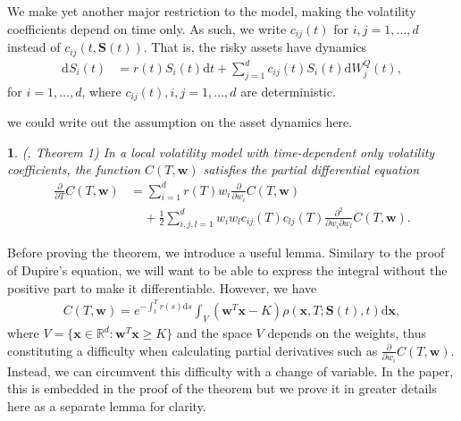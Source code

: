 \documentclass[english]{article}
\newcommand{\comment}[1]{\color{blue}#1\color{black}}
\numberwithin{equation}{section}
\numberwithin{figure}{section}
\theoremstyle{bolddescit}
\newtheorem{theorem}{\protect\theoremname}[section]
\theoremstyle{definition}
\theoremstyle{definition}
\theoremstyle{plain}
\theoremstyle{plain}
\theoremstyle{bolddesc}
\theoremstyle{plain}
\theoremstyle{remark}
\providecommand{\theoremname}{Theorem}
\begin{document}
We make yet another major restriction to the model, making the volatility coefficients depend on time only. As such, we write $c_{ij}(t)$ for $i,j=1,\ldots,d$ instead of $c_{ij}(t,\mathbf{S}(t))$. That is, the risky assets have dynamics
\begin{align*}
  \mathrm{d}S_i(t) &= r(t) S_i(t) \mathrm{d}t + \sum_{j=1}^{d} c_{ij}(t) S_i(t) \mathrm{d}W^Q_j(t),
\end{align*}
for $i=1,\ldots,d$, where $c_{ij}(t), i,j=1,\ldots,d$ are deterministic.

\comment{we could write out the assumption on the asset dynamics here.}

\begin{theorem}\label{thm:generalisation}
  (\cite{pablo_amster_towards_2009}, Theorem 1)
  In a local volatility model with time-dependent only volatility coefficients, the function $C(T,\mathbf{w})$ satisfies the partial differential equation
  \begin{align*}
      \frac{\partial}{\partial T} C(T,\mathbf{w})
      &= \sum_{i=1}^{d} r(T) w_i \frac{\partial}{\partial w_i} C(T,\mathbf{w})\\
      &\ \ \ \ \ + \frac{1}{2} \sum_{i,j,l=1}^{d} w_i w_l c_{ij}(T) c_{lj}(T) \frac{\partial^2}{\partial w_i \partial w_l} C(T,\mathbf{w}).
  \end{align*}
\end{theorem}

Before proving the theorem, we introduce a useful lemma. Similary to the proof of Dupire's equation, we will want to be able to express the integral without the positive part to make it differentiable. However, we have
\begin{align}\label{eq:generalisation-int-over-V}
  C(T,\mathbf{w}) = e^{-\int_t^T r(s) \mathrm{d}s} \int_V (\mathbf{w}^T\mathbf{x} - K) \rho(\mathbf{x},T;\mathbf{S}(t),t) \mathrm{d}\mathbf{x},
\end{align}
where $V = \{ \mathbf{x} \in \mathbb{R}^d : \mathbf{w}^T \mathbf{x} \ge K \}$ and the space $V$ depends on the weights, thus constituting a difficulty when calculating partial derivatives such as $\frac{\partial}{\partial w_i}C(T,\mathbf{w})$. Instead, we can circumvent this difficulty with a change of variable. In the paper, this is embedded in the proof of the theorem but we prove it in greater details here as a separate lemma for clarity.
\end{document}
